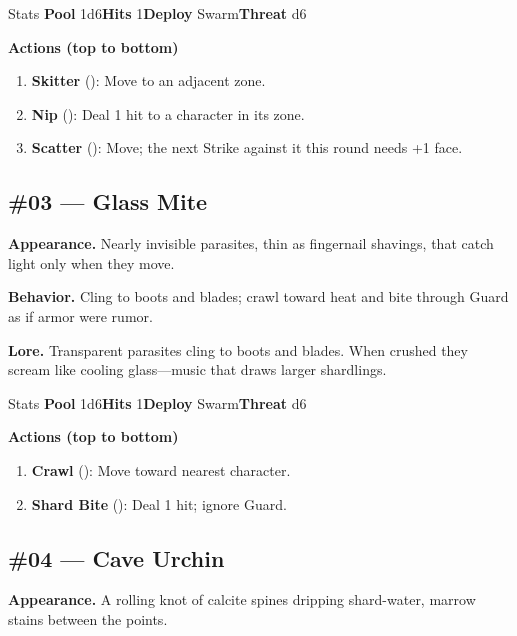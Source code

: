\begin{monsterentry}{Stats}
\textbf{Pool} 1d6\quad\textbf{Hits} 1\quad\textbf{Deploy} Swarm\quad\textbf{Threat} d6

\textbf{Actions (top to bottom)}
\begin{enumerate}\setlength{\itemsep}{0.15em}\setlength{\parskip}{0pt}
  \item \textbf{Skitter} (\easy): Move to an adjacent zone.
  \item \textbf{Nip} (\easy): Deal 1 hit to a character in its zone.
  \item \textbf{Scatter} (\medium): Move; the next Strike against it this round needs +1 face.
\end{enumerate}
\end{monsterentry}

\subsection*{\#03 --- Glass Mite}

\textbf{Appearance.} Nearly invisible parasites, thin as fingernail shavings, that catch light only when they move.

\textbf{Behavior.} Cling to boots and blades; crawl toward heat and bite through Guard as if armor were rumor.

\textbf{Lore.} Transparent parasites cling to boots and blades. When crushed they scream like cooling glass---music that draws larger shardlings.

\begin{monsterentry}{Stats}
\textbf{Pool} 1d6\quad\textbf{Hits} 1\quad\textbf{Deploy} Swarm\quad\textbf{Threat} d6

\textbf{Actions (top to bottom)}
\begin{enumerate}\setlength{\itemsep}{0.15em}\setlength{\parskip}{0pt}
  \item \textbf{Crawl} (\easy): Move toward nearest character.
  \item \textbf{Shard Bite} (\medium): Deal 1 hit; ignore Guard.
\end{enumerate}
\end{monsterentry}

\subsection*{\#04 --- Cave Urchin}

\textbf{Appearance.} A rolling knot of calcite spines dripping shard-water, marrow stains between the points.

